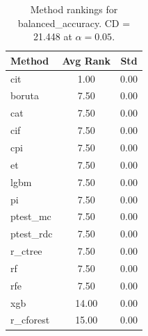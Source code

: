 \begin{table}[h]
\centering
\caption{Method rankings for balanced_accuracy. CD = 21.448 at $\alpha=0.05$.}
\label{tab:ranks_balanced_accuracy}
\begin{tabular}{lcc}
\toprule
Method & Avg Rank & Std \\
\midrule
cit & 1.00 & 0.00 \\
boruta & 7.50 & 0.00 \\
cat & 7.50 & 0.00 \\
cif & 7.50 & 0.00 \\
cpi & 7.50 & 0.00 \\
et & 7.50 & 0.00 \\
lgbm & 7.50 & 0.00 \\
pi & 7.50 & 0.00 \\
ptest_mc & 7.50 & 0.00 \\
ptest_rdc & 7.50 & 0.00 \\
r_ctree & 7.50 & 0.00 \\
rf & 7.50 & 0.00 \\
rfe & 7.50 & 0.00 \\
xgb & 14.00 & 0.00 \\
r_cforest & 15.00 & 0.00 \\
\bottomrule
\end{tabular}
\end{table}